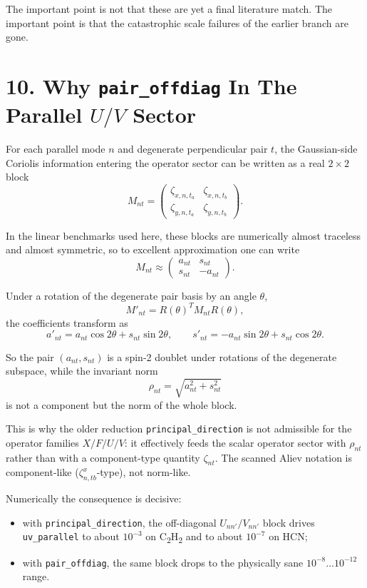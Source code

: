 \documentclass[11pt]{article}
\begin{document}
The important point is not that these are yet a final literature match. The
important point is that the catastrophic scale failures of the earlier branch
are gone.

\section*{10. Why \texorpdfstring{\texttt{pair\_offdiag}}{pair\_offdiag} In The Parallel \texorpdfstring{$U/V$}{U/V} Sector}

For each parallel mode $n$ and degenerate perpendicular pair $t$, the
Gaussian-side Coriolis information entering the operator sector can be written
as a real $2\times 2$ block
\[
M_{nt}=
\begin{pmatrix}
\zeta_{x,n,t_a} & \zeta_{x,n,t_b}\\
\zeta_{y,n,t_a} & \zeta_{y,n,t_b}
\end{pmatrix}.
\]

In the linear benchmarks used here, these blocks are numerically almost
traceless and almost symmetric, so to excellent approximation one can write
\[
M_{nt}\approx
\begin{pmatrix}
a_{nt} & s_{nt}\\
s_{nt} & -a_{nt}
\end{pmatrix}.
\]

Under a rotation of the degenerate pair basis by an angle $\theta$,
\[
M'_{nt}=R(\theta)^T M_{nt}R(\theta),
\]
the coefficients transform as
\[
a'_{nt}=a_{nt}\cos 2\theta + s_{nt}\sin 2\theta,
\qquad
s'_{nt}=-a_{nt}\sin 2\theta + s_{nt}\cos 2\theta.
\]

So the pair $(a_{nt},s_{nt})$ is a spin-2 doublet under rotations of the
degenerate subspace, while the invariant norm
\[
\rho_{nt}=\sqrt{a_{nt}^2+s_{nt}^2}
\]
is not a component but the norm of the whole block.

This is why the older reduction \texttt{principal\_direction} is not admissible
for the operator families $X/F/U/V$: it effectively feeds the scalar operator
sector with $\rho_{nt}$ rather than with a component-type quantity
$\zeta_{nt}$. The scanned Aliev notation is component-like
($\zeta^x_{n,tb}$-type), not norm-like.

Numerically the consequence is decisive:
\begin{itemize}
\item with \texttt{principal\_direction}, the off-diagonal
$U_{nn'}/V_{nn'}$ block drives \texttt{uv\_parallel} to about $10^{-3}$ on
\texorpdfstring{C\textsubscript{2}H\textsubscript{2}}{C2H2} and to about
$10^{-7}$ on HCN;
\item with \texttt{pair\_offdiag}, the same block drops to the physically sane
$10^{-8}\dots 10^{-12}$ range.
\end{itemize}
\end{document}
